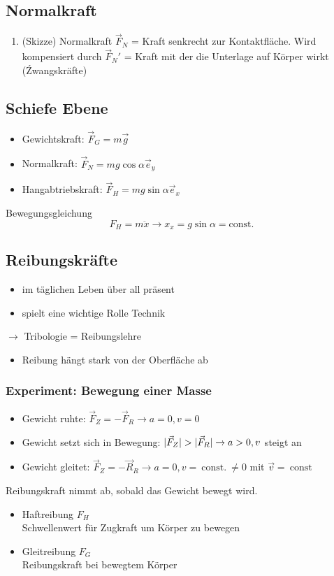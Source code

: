 \documentclass[a4paper]{scrartcl}
\DeclarePairedDelimiter\abs{\lvert}{\rvert}%
\renewcommand{\v}[1]{\vec{#1}}
\theoremstyle{definition}
\theoremstyle{plain}
\theoremstyle{plain}
\theoremstyle{remark}
\theoremstyle{remark}
\theoremstyle{remark}
\begin{document}
\subsection{Normalkraft}
\label{sec-3-5}
\begin{enumerate}
\item (Skizze) Normalkraft $\v{F}_N$ = Kraft senkrecht zur Kontaktfläche. Wird kompensiert durch $\v{F}_N'$ = Kraft mit der die Unterlage auf Körper wirkt (Źwangskräfte)
\end{enumerate}
\subsection{Schiefe Ebene}
\label{sec-3-6}
\begin{itemize}
\item Gewichtskraft: $\v{F}_G = m\v g$
\item Normalkraft: $\v{F}_N = m g\cos{\alpha} \v{e}_y$
\item Hangabtriebskraft: $\v{F}_H = m g\sin{\alpha} \v{e}_x$
\end{itemize}
Bewegungsgleichung
\[F_H = m\ddot{x} \rightarrow x_x = g\sin{\alpha} =\text{const.}\]
\subsection{Reibungskräfte}
\label{sec-3-7}
\begin{itemize}
\item im täglichen Leben über all präsent
\item spielt eine wichtige Rolle Technik
\end{itemize}
$\rightarrow$ Tribologie = Reibungslehre
\begin{itemize}
\item Reibung hängt stark von der Oberfläche ab
\end{itemize}
\subsubsection{Experiment: Bewegung einer Masse}
\label{sec-3-7-1}
\begin{itemize}
\item Gewicht ruhte: $\v{F}_Z = - \v{F}_R \to a = 0, v = 0$
\item Gewicht setzt sich in Bewegung: $\abs{\v{F}_Z} > \abs{\v{F}_R} \to a > 0,v$ steigt an
\item Gewicht gleitet: $\v{F}_Z = - \v{R}_R \to a = 0, v =~\text{const.}~\neq 0$ mit $\v v =~\text{const}~$
\end{itemize}
Reibungskraft nimmt ab, sobald das Gewicht bewegt wird.
\begin{itemize}
\item Haftreibung $F_H$ \\
           Schwellenwert für Zugkraft um Körper zu bewegen
\item Gleitreibung $F_G$ \\
           Reibungskraft bei bewegtem Körper
\end{itemize}
\end{document}
